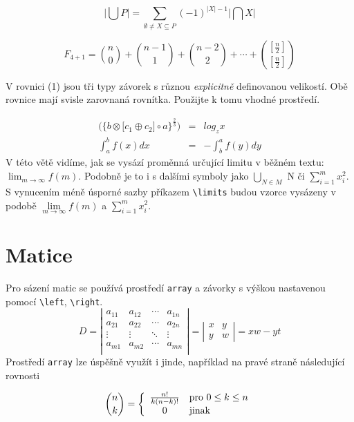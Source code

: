 \documentclass[a4paper, twocolumn, 11pt]{article}
\begin{document}
\begin{displaymath}
    \Big|\bigcup P\Big| = \sum\limits _{\emptyset \neq X \subseteq P} (-1)^{|X|-1}\Big|\bigcap X\Big|
\end{displaymath}

\begin{displaymath}
    F_{4+1} = \binom{n}{0} + \binom{n - 1}{1} + \binom{n - 2}{2} + \cdots + \binom{[\frac{n}{2}]}{[\frac{n}{2}]}
\end{displaymath}

V rovnici (1) jsou tři typy závorek s různou \textit{explicitně} definovanou velikostí. Obě rovnice mají svisle zarovnaná rovnítka. Použijte k tomu vhodné prostředí.


\begin{eqnarray}
\bigg( \Big\{b \otimes \big[ c_1 \oplus c_2 \big] \circ a \Big\}^{\frac{2}{3}} \bigg) & = & log_z x \\
\int_a^b f(x)dx & = & -\int_b^a f(y)dy
\end{eqnarray}
V této větě vidíme, jak se vysází proměnná určující
limitu v běžném textu: $\lim_{m \to \infty} f(m)$.
Podobně je to i s dalšími symboly jako $\bigcup_{N\in M}$ N či $\sum\nolimits_{i=1}^m x_i^2$. 
S vynucením méně úsporné sazby příkazem \verb|\limits| budou
vzorce vysázeny v podobě $\lim\limits_{m \to \infty} f(m)$ a
$\sum\limits_{i=1}^m x_i^2$.

\section{Matice}
Pro sázení matic se používá prostředí \texttt{array} a závorky
s výškou nastavenou pomocí \verb|\left|, \verb|\right|.
\[
D = \left| 
\begin{array}{cccc}
    a_{11} & a_{12} & \cdots & a_{1n} \\
    a_{21} & a_{22} & \cdots & a_{2n} \\
    \vdots & \vdots & \ddots & \vdots \\
    a_{m1} & a_{m2} & \cdots & a_{mn} \\
\end{array} 
\right| 
=
\left|
\begin{array}{cc}
    x & y \\
    y & w
\end{array}
\right|
=
xw - yt
\]
Prostředí \texttt{array} lze úspěšně využít i jinde, například
na pravé straně následující rovnosti

$$ \binom{n}{k} = \left\{
\begin{array}{c l}
\frac{n!}{k(n-k)!} & \text{pro } 0 \leq k \leq n \\
0 & \text{jinak}
\end{array} \right. $$
\end{document}
